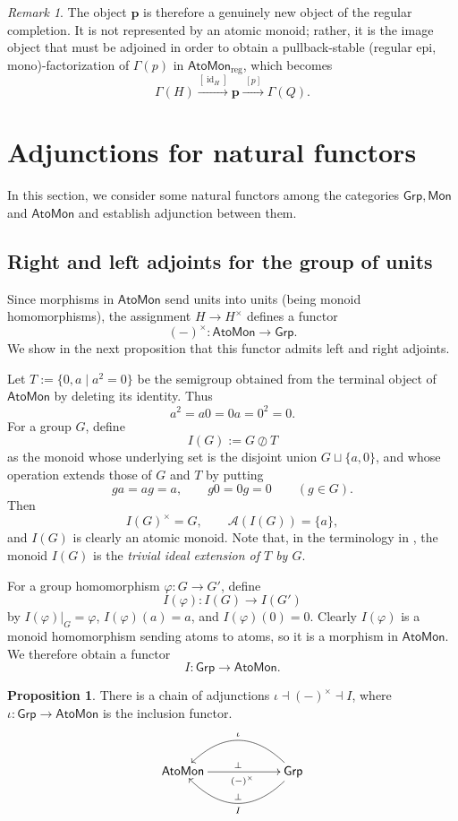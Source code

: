 \documentclass[a4paper,10pt,reqno]{amsart}
\theoremstyle{definition}
\newtheorem{proposition}[theorem]{Proposition}
\theoremstyle{remark}
\newtheorem{remark}[theorem]{Remark}
\newcommand{\AtoMon}{\mathsf{AtoMon}}
\newcommand{\Mon}{\mathsf{Mon}}
\newcommand{\Grp}{\mathsf{Grp}}
\newcommand{\A}{\mathscr A}
\begin{document}
\begin{remark}
The object $\mathbf p$ is therefore a genuinely new object of the regular
completion. It is not represented by an atomic monoid; rather, it is the
image object that must be adjoined in order to obtain a pullback-stable
(regular epi, mono)-factorization of $\Gamma(p)$ in $\AtoMon_\mathrm{reg}$, which becomes
$$
\Gamma(H) \xrightarrow{[\operatorname{id}_H]} \mathbf{p} \xrightarrow{\;[p]\;} \Gamma(Q).
$$
\end{remark}

\section{Adjunctions for natural functors}\label{sec:adjunctions}

In this section, we consider some natural functors among the categories $\Grp, \Mon$ and $\AtoMon$ and establish adjunction between them.

\subsection{Right and left adjoints for the group of units}\label{subsec:grpunits}
Since morphisms in $\AtoMon$ send units into units (being monoid homomorphisms), the assignment $H\to H^\times$ defines a functor
$$
(-)^\times: \AtoMon \to  \mathsf{Grp}.
$$
We show in the next proposition that this functor admits left and right adjoints. 

Let $T:=\{0,a\mid a^2=0\}$ be the semigroup obtained from the terminal
object of $\AtoMon$ by deleting its identity.  Thus
$$
 a^2=a0=0a=0^2=0.
$$
For a group $G$, define
$$
 I(G):=G\oslash T
$$
as the monoid whose underlying set is the disjoint union $G\sqcup\{a,0\}$, and whose operation extends those of $G$ and $T$ by putting
$$
 ga=ag=a,
 \qquad
 g0=0g=0
 \qquad(g\in G).
$$
Then
$$
 I(G)^\times=G,
 \qquad
 \A(I(G))=\{a\},
$$
and $I(G)$ is clearly an atomic monoid. Note that, in the terminology in \cite[Section~3]{CT4}, the monoid $I(G)$ is the {\em trivial ideal extension of $T$ by $G$}.

For a group homomorphism $\varphi:G\to G'$, define
$$
 I(\varphi):I(G)\to I(G')
$$
by $I(\varphi)|_G=\varphi$, $I(\varphi)(a)=a$, and $I(\varphi)(0)=0$.  Clearly $I(\varphi)$ is a monoid homomorphism sending atoms to atoms, so it is a morphism in $\AtoMon$. We therefore obtain a functor
$$
I:\Grp\to\AtoMon.
$$

\begin{proposition}\label{prop:adjunctions}
There is a chain of adjunctions $\iota\dashv(-)^\times\dashv I$, where $\iota:\Grp\to\AtoMon$ is the inclusion functor.
$$
    \xymatrix@!=20pt{
    \AtoMon \ar[rr]_{\;\;\;(-)^\times}^\perp  & & \mathsf{Grp} \ar@/_2.1pc/[ll]_{\iota} \ar@/^2.1pc/[ll]^I_\perp 
    }
$$

\end{proposition}
\end{document}
